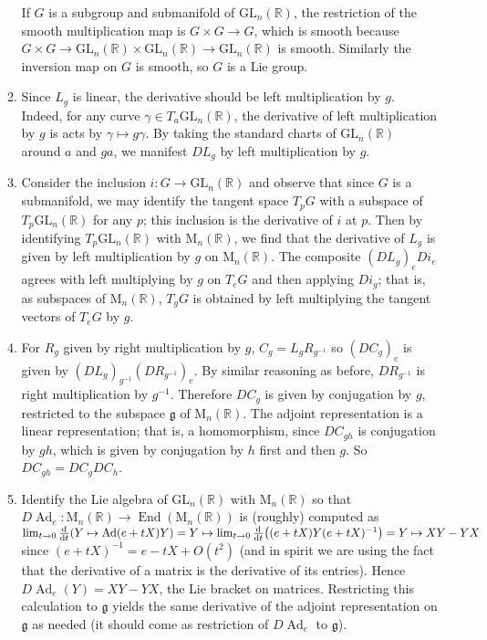 \documentclass[11pt,leqno]{article}
\theoremstyle{plain}
\theoremstyle{definition}
\numberwithin{equation}{section}
\numberwithin{lem}{section}
\DeclareMathOperator{\Ad}{Ad}
\DeclareMathOperator{\End}{End}
\newcommand{\GL}{\mathrm{GL}}
\newcommand{\Mat}{\mathrm{M}}
\begin{document}
\begin{enumerate}
\begin{enumerate}
      If $G$ is a subgroup and submanifold of $\GL_n(\mathbb R)$, the restriction of the smooth multiplication map is $G\times G\to G$, which is smooth because $G\times G\to \GL_n(\mathbb R)\times \GL_n(\mathbb R)\to \GL_n(\mathbb R)$ is smooth. Similarly the inversion map on $G$ is smooth, so $G$ is a Lie group.
      \item Since $L_g$ is linear, the derivative should be left multiplication by $g$. Indeed, for any curve $\gamma\in T_a\GL_n(\mathbb R)$, the derivative of left multiplication by $g$ is acts by $\gamma\mapsto g\gamma$. By taking the standard charts of $\GL_n(\mathbb R)$ around $a$ and $ga$, we manifest $DL_g$ by left multiplication by $g$.
      \item Consider the inclusion $i\colon G\to \GL_n(\mathbb R)$ and observe that since $G$ is a submanifold, we may identify the tangent space $T_pG$ with a subspace of $T_p\GL_n(\mathbb R)$ for any $p$; this inclusion is the derivative of $i$ at $p$. Then by identifying $T_p\GL_n(\mathbb R)$ with $\Mat_n(\mathbb R)$, we find that the derivative of $L_g$ is given by left multiplication by $g$ on $\Mat_n(\mathbb R)$. The composite $(DL_g)_e Di_e$ agrees with left multiplying by $g$ on $T_eG$ and then applying $Di_g$; that is, as subspaces of $\Mat_n(\mathbb R)$, $T_gG$ is obtained by left multiplying the tangent vectors of $T_eG$ by $g$.
      \item For $R_g$ given by right multiplication by $g$, $C_g = L_gR_{g^{-1}}$ so $(DC_g)_e$ is given by $(DL_g)_{g^{-1}}(DR_{g^{-1}})_e$. By similar reasoning as before, $DR_{g^{-1}}$ is right multiplication by $g^{-1}$. Therefore $DC_g$ is given by conjugation by $g$, restricted to the subspace $\mathfrak g$ of $\Mat_n(\mathbb R)$. The adjoint representation is a linear representation; that is, a homomorphism, since $DC_{gh}$ is conjugation by $gh$, which is given by conjugation by $h$ first and then $g$. So $DC_{gh} = DC_gDC_h$.
      \item Identify the Lie algebra of $\GL_n(\mathbb R)$ with $\Mat_n(\mathbb R)$ so that $D\Ad_e\colon \Mat_n(\mathbb R)\to \End(\Mat_n(\mathbb R))$ is (roughly) computed as $\lim_{t\to 0}\dv{t}(Y\mapsto\Ad(e+tX)Y) = Y\mapsto \lim_{t\to 0}\dv{t}((e+tX)Y(e+tX)^{-1}) = Y\mapsto XY-YX$ since $(e+tX)^{-1} = e-tX + O(t^2)$ (and in spirit we are using the fact that the derivative of a matrix is the derivative of its entries). Hence $D\Ad_e(Y) = XY-YX$, the Lie bracket on matrices. Restricting this calculation to $\mathfrak g$ yields the same derivative of the adjoint representation on $\mathfrak g$ as needed (it should come as restriction of $D\Ad_e$ to $\mathfrak g$).
    \end{enumerate}
\end{enumerate}
\end{document}
